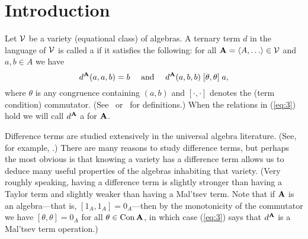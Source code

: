 \newtheorem{thm}{Theorem}[section]
\newtheorem{lem}[thm]{Lemma}
\newtheorem{cor}[thm]{Corollary}

\newtheorem{rem}[thm]{Remark}
\newtheorem{prob}{Problem}







\section{Introduction}
\label{sec:introduction}
Let $\mathcal{V}$ be a variety (equational class) of algebras.
A ternary term $d$ in the language of $\mathcal{V}$ is called 
a  if it satisfies the following:
for all $\bA = \<A, \dots \> \in \sV$ and $a, b \in A$ we have
\begin{equation}
\label{eq:3}  
d^{\bA}(a,a,b) = b \quad \text{ and } \quad
d^{\bA}(a,b,b) \comm \theta \theta a,
\end{equation}
where $\theta$ is any congruence %
containing $(a,b)$
and $[\cdot, \cdot]$ denotes the (term condition) commutator.
(See~\cite{HM:1988} or~\cite{MR3076179} for definitions.)
When the relations in (\ref{eq:3}) hold we will call $d^{\mathbf{A}}$
a  for $\mathbf{A}$.

Difference terms are studied extensively in the universal algebra literature.
(See, for example, \cite{HM:1988,KSW,MR3449235,MR1358491,MR3076179,MR1663558}.)
There are many reasons to study difference terms, but
perhaps the most obvious is that knowing a variety 
has a difference term allows us to deduce many useful
properties of the algebras inhabiting that variety.
(Very roughly speaking, having a difference term is slightly stronger than having
a Taylor term and slightly weaker than having a Mal'tsev term.
Note that if
$\mathbf{A}$ is an  algebra---that is, $[1_A, 1_A] = 0_A$---then by
the monotonicity of the commutator we have
$[\theta, \theta] = 0_A$ for all $\theta \in \operatorname{Con} \mathbf{A}$, in which case
(\ref{eq:3}) says that $d^{\mathbf{A}}$ is a Mal'tsev term operation.)

